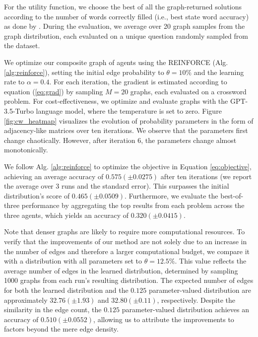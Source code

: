 \documentclass{article}
\theoremstyle{plain}
\theoremstyle{definition}
\theoremstyle{remark}
\begin{document}
For the utility function, we choose the best of all the graph-returned solutions according to the number of words correctly filled (i.e., best state word accuracy) as done by \citet{yao2023tree}.
During the evaluation, we average over 20 graph samples from the graph distribution, each evaluated on a unique question randomly sampled from the dataset.

We optimize our composite graph of agents using the REINFORCE (Alg. \ref{alg:reinforce}), setting the initial edge probability to $\theta = 10\%$ and the learning rate to $\alpha = 0.4$.
For each iteration, the gradient is estimated according to equation (\ref{eq:grad}) by sampling $M = 20$ graphs, each evaluated on a crossword problem.
For cost-effectiveness, we optimize and evaluate graphs with
the GPT-3.5-Turbo language model, where the temperature is set to zero.
Figure \ref{fig:cw_heatmap} visualizes the evolution of probability parameters in the form of adjacency-like matrices over ten iterations.
We observe that the parameters first change chaotically.
However, after iteration 6, the parameters change almost monotonically. 

We follow Alg. \ref{alg:reinforce} to optimize the objective in Equation \ref{eq:objective}, achieving an average accuracy of $0.575 (\pm 0.0275)$ after ten iterations (we report the average over $3$ runs and the standard error).
This surpasses the initial distribution's score of $0.465 (\pm 0.0509)$.
Furthermore, we evaluate the best-of-three performance by aggregating the top results from each problem across the three agents, which yields an accuracy of $0.320 (\pm 0.0415)$.

Note that denser graphs are likely to require more computational resources.
To verify that the improvements of our method are not solely due to an increase in the number of edges and therefore a larger computational budget, we compare it with a distribution with all parameters set to $\theta = 12.5\%$.
This value reflects the average number of edges in the learned distribution, determined by sampling 1000 graphs from each run's resulting distribution.
The expected number of edges for both the learned distribution and the $0.125$ parameter-valued distribution are approximately $32.76 (\pm 1.93)$ and $32.80 (\pm 0.11)$, respectively.
Despite the similarity in the edge count, the $0.125$ parameter-valued distribution achieves an accuracy of $0.510 (\pm 0.0552)$, allowing us to attribute the improvements to factors beyond the mere edge density.
\end{document}
